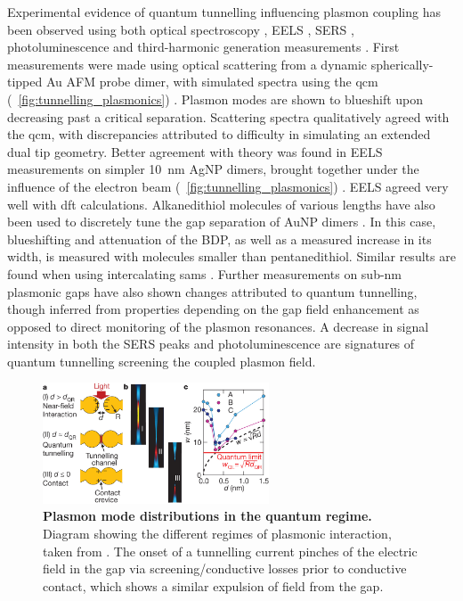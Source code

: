 \documentclass{article}
\begin{document}
Experimental evidence of quantum tunnelling influencing plasmon coupling has been observed using both optical spectroscopy \cite{savage2012, cha2014, zhu2014}, EELS \cite{scholl2013}, SERS \cite{zhu2014}, photoluminescence \cite{kravtsov2014} and third-harmonic generation measurements \cite{hajisalem2014}.
First measurements were made using optical scattering from a dynamic spherically-tipped Au AFM probe dimer, with simulated spectra using the \gls{qcm} (\figurename~\ref{fig:tunnelling_plasmonics}) \cite{savage2012}. Plasmon modes are shown to blueshift upon decreasing past a critical separation. Scattering spectra qualitatively agreed with the \gls{qcm}, with discrepancies attributed to difficulty in simulating an extended dual tip geometry. Better agreement with theory was found in EELS measurements on simpler \SI{10}{nm} AgNP dimers, brought together under the influence of the electron beam (\figurename~\ref{fig:tunnelling_plasmonics}) \cite{scholl2013}. EELS agreed very well with \gls{dft} calculations.
Alkanedithiol molecules of various lengths have also been used to discretely tune the gap separation of AuNP dimers \cite{cha2014}. In this case, blueshifting and attenuation of the BDP, as well as a measured increase in its width, is measured with molecules smaller than pentanedithiol. Similar results are found when using intercalating \glspl{sam} \cite{tan2014}.
Further measurements on sub-nm plasmonic gaps have also shown changes attributed to quantum tunnelling, though inferred from properties depending on the gap field enhancement as opposed to direct monitoring of the plasmon resonances. A decrease in signal intensity in both the SERS peaks \cite{zhu2014} and photoluminescence \cite{kravtsov2014} are signatures of quantum tunnelling screening the coupled plasmon field.

\begin{figure}[bt]
\centering
\includegraphics[width=0.6\textwidth]{figures/literature/nature11653-f3_2}
\caption[Plasmon mode distributions in the quantum regime]{\textbf{Plasmon mode distributions in the quantum regime.} Diagram showing the different regimes of plasmonic interaction, taken from \cite{savage2012}. The onset of a tunnelling current pinches of the electric field in the gap via screening/conductive losses prior to conductive contact, which shows a similar expulsion of field from the gap.}
\label{fig:savage2012c}
\end{figure}
\end{document}
